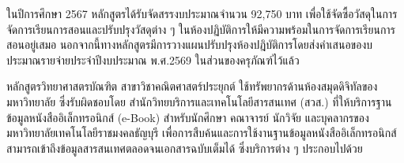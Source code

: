 ในปีการศึกษา 2567 หลักสูตรได้รับจัดสรรงบประมาณจำนวน 92,750 บาท เพื่อใช้จัดซื้อวัสดุในการจัดการเรียนการสอนและปรับปรุงวัสดุต่าง ๆ ในห้องปฏิบัติการให้มีความพร้อมในการจัดการเรียนการสอนอยู่เสมอ นอกจากนี้ทางหลักสูตรมีการวางแผนปรับปรุงห้องปฎิบัติการโดยส่งคำเสนอของบประมาณรายจ่ายประจำปีงบประมาณ พ.ศ.2569 ในส่วนของครุภัณฑ์ไว้แล้ว



\begin{doclist}
\end{doclist}


หลักสูตรวิทยาศาสตรบัณฑิต สาขาวิชาคณิตศาสตร์ประยุกต์ ใช้ทรัพยากรด้านห้องสมุดดิจิทัลของ
มหาวิทยาลัย ซึ่งรับผิดชอบโดย สำนักวิทยบริการและเทคโนโลยีสารสนเทศ (สวส.) ที่ให้บริการฐานข้อมูลหนังสืออิเล็กทรอนิกส์ (e-Book) สำหรับนักศึกษา คณาจารย์ นักวิจัย และบุคลากรของมหาวิทยาลัยเทคโนโลยีราชมงคลธัญบุรี เพื่อการสืบค้นและการใช้งานฐานข้อมูลหนังสืออิเล็กทรอนิกส์สามารถเข้าถึงข้อมูลสารสนเทศตลอดจนเอกสารฉบับเต็มได้ ซึ่งบริการต่าง ๆ ประกอบไปด้วย
